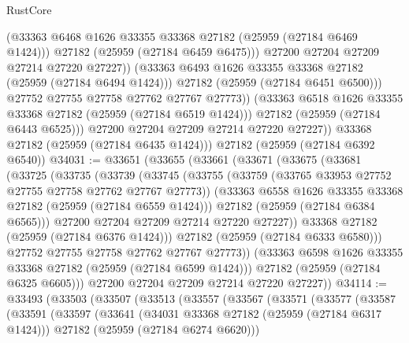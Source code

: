 \begin{lexlean}{RustCore}
\begin{coremodule}
                        (@33363 @6468 @1626 @33355 @33368 @27182 (@25959 (@27184 @6469 @1424)))
                        @27182
                        (@25959 (@27184 @6459 @6475)))
                      @27200
                      @27204
                      @27209
                      @27214
                      @27220
                      @27227))
                  (@33363 @6493 @1626 @33355 @33368 @27182 (@25959 (@27184 @6494 @1424)))
                  @27182
                  (@25959 (@27184 @6451 @6500)))
                @27752
                @27755
                @27758
                @27762
                @27767
                @27773))
            (@33363 @6518 @1626 @33355 @33368 @27182 (@25959 (@27184 @6519 @1424)))
            @27182
            (@25959 (@27184 @6443 @6525)))
          @27200
          @27204
          @27209
          @27214
          @27220
          @27227))
      @33368
      @27182
      (@25959 (@27184 @6435 @1424)))
    @27182
    (@25959 (@27184 @6392 @6540))
@34031 := @33651
    (@33655
      (@33661
        (@33671
          (@33675
            (@33681
              (@33725
                (@33735
                  (@33739
                    (@33745
                      (@33755
                        (@33759 (@33765 @33953 @27752 @27755 @27758 @27762 @27767 @27773))
                        (@33363 @6558 @1626 @33355 @33368 @27182 (@25959 (@27184 @6559 @1424)))
                        @27182
                        (@25959 (@27184 @6384 @6565)))
                      @27200
                      @27204
                      @27209
                      @27214
                      @27220
                      @27227))
                  @33368
                  @27182
                  (@25959 (@27184 @6376 @1424)))
                @27182
                (@25959 (@27184 @6333 @6580)))
              @27752
              @27755
              @27758
              @27762
              @27767
              @27773))
          (@33363 @6598 @1626 @33355 @33368 @27182 (@25959 (@27184 @6599 @1424)))
          @27182
          (@25959 (@27184 @6325 @6605)))
        @27200
        @27204
        @27209
        @27214
        @27220
        @27227))
@34114 := @33493
    (@33503
      (@33507
        (@33513
          (@33557
            (@33567
              (@33571
                (@33577
                  (@33587
                    (@33591
                      (@33597
                        (@33641
                          (@34031 @33368 @27182 (@25959 (@27184 @6317 @1424)))
                          @27182
                          (@25959 (@27184 @6274 @6620)))

\end{coremodule}
\end{lexlean}
